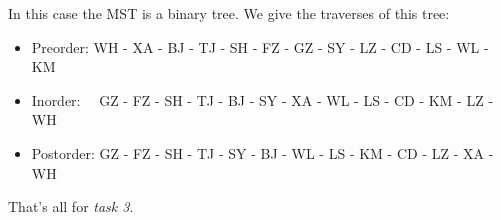 In this case the MST is a binary tree. 
We give the traverses of this tree:
\begin{itemize}
    \item Preorder: WH - XA - BJ - TJ - SH - FZ - GZ - SY - LZ - CD - LS - WL - KM
    \item Inorder: \ \ GZ - FZ - SH - TJ - BJ - SY - XA - WL - LS - CD - KM - LZ - WH
    \item Postorder: GZ - FZ - SH - TJ - SY - BJ - WL - LS - KM - CD - LZ - XA - WH
\end{itemize}

That's all for \textit{task 3}.